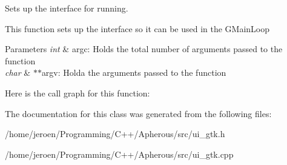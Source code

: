 Sets up the interface for running. 

This function sets up the interface so it can be used in the G\+Main\+Loop


\begin{DoxyParams}{Parameters}
{\em int} & argc\+: Holds the total number of arguments passed to the function \\
\hline
{\em char} & $\ast$$\ast$argv\+: Holda the arguments passed to the function \\
\hline
\end{DoxyParams}


Here is the call graph for this function\+:




The documentation for this class was generated from the following files\+:\begin{DoxyCompactItemize}
\item 
/home/jeroen/\+Programming/\+C++/\+Apherous/src/ui\+\_\+gtk.\+h\item 
/home/jeroen/\+Programming/\+C++/\+Apherous/src/ui\+\_\+gtk.\+cpp\end{DoxyCompactItemize}
